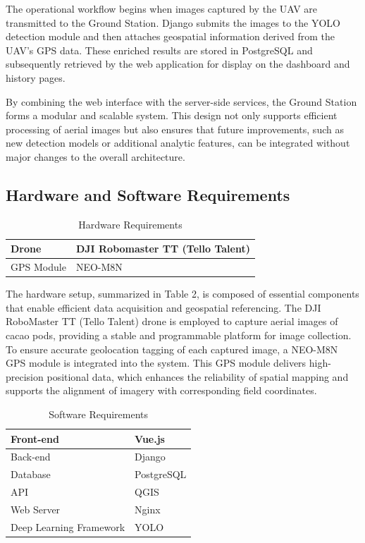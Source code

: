 	The operational workflow begins when images captured by the UAV are transmitted to the Ground Station. Django submits the images to the YOLO detection module and then attaches geospatial information derived from the UAV’s GPS data. These enriched results are stored in PostgreSQL and subsequently retrieved by the web application for display on the dashboard and history pages.
	
	By combining the web interface with the server-side services, the Ground Station forms a modular and scalable system. This design not only supports efficient processing of aerial images but also ensures that future improvements, such as new detection models or additional analytic features, can be integrated without major changes to the overall architecture.
	
	
	\subsection{Hardware and Software Requirements}
	
	\begin{table}[H]
		\centering
		\caption{Hardware Requirements}
		\label{tab:hardreq}
		\begin{tabular}{ll}
			\toprule
			Drone & DJI Robomaster TT (Tello Talent) \\
			\midrule
			GPS Module & NEO-M8N \\
			\bottomrule
		\end{tabular}
	\end{table}
	
	The hardware setup, summarized in Table 2, is composed of essential components that enable efficient data acquisition and geospatial referencing. The DJI RoboMaster TT (Tello Talent) drone is employed to capture aerial images of cacao pods, providing a stable and programmable platform for image collection. To ensure accurate geolocation tagging of each captured image, a NEO-M8N GPS module is integrated into the system. This GPS module delivers high-precision positional data, which enhances the reliability of spatial mapping and supports the alignment of imagery with corresponding field coordinates.
	
	\begin{table}[H]
		\centering
		\caption{Software Requirements}
		\label{tab:softreq}
		\begin{tabular}{ll}
			\toprule
			Front-end & Vue.js \\
			\midrule
			Back-end & Django \\
			\midrule
			Database & PostgreSQL \\
			\midrule
			API & QGIS \\
			\midrule
			Web Server & Nginx \\
			\midrule
			Deep Learning Framework & YOLO \\
			\bottomrule
		\end{tabular}
	\end{table}
	
